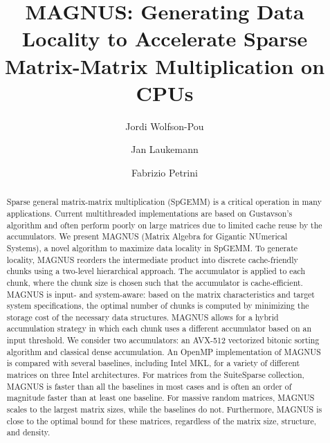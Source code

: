 \documentclass[sigconf, 10pt, screen]{acmart}
\begin{document}
\title{MAGNUS: Generating Data Locality to Accelerate Sparse Matrix-Matrix Multiplication on CPUs}

\author{Jordi Wolfson-Pou}

\author{Jan Laukemann}


\author{Fabrizio Petrini}

\begin{abstract}
Sparse general matrix-matrix multiplication (SpGEMM) is a critical operation in many applications.  Current multithreaded implementations are based on Gustavson’s algorithm and often perform poorly on large matrices due to limited cache reuse by the accumulators.  We present MAGNUS (Matrix Algebra for Gigantic NUmerical Systems), a novel algorithm to maximize data locality in SpGEMM.  To generate locality, MAGNUS reorders the intermediate product into discrete cache-friendly chunks using a two-level hierarchical approach.  The accumulator is applied to each chunk, where the chunk size is chosen such that the accumulator is cache-efficient.  MAGNUS is input- and system-aware: based on the matrix characteristics and target system specifications, the optimal number of chunks is computed by minimizing the storage cost of the necessary data structures.  MAGNUS allows for a hybrid accumulation strategy in which each chunk uses a different accumulator based on an input threshold.  We consider two accumulators: an AVX-512 vectorized bitonic sorting algorithm and classical dense accumulation.  An OpenMP implementation of MAGNUS is compared with several baselines, including Intel MKL, for a variety of different matrices on three Intel architectures.  For matrices from the SuiteSparse collection, MAGNUS is faster than all the baselines in most cases and is often an order of magnitude faster than at least one baseline.  For massive random matrices, MAGNUS scales to the largest matrix sizes, while the baselines do not.  Furthermore, MAGNUS is close to the optimal bound for these matrices, regardless of the matrix size, structure, and density.
\end{abstract}
\end{document}
